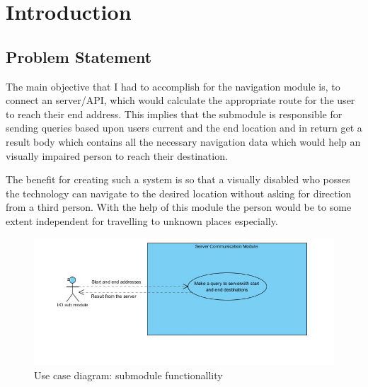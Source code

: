 \newpage
\chapter{Introduction}
	\section{Problem Statement}
		\label{sec:introProblemStatement}
		The main objective that I had to accomplish for the navigation module is, to connect an 
		server/API, which would calculate the appropriate route for the user to reach their end address. 
		This implies that the submodule is responsible for sending queries based upon users 
		current and the end location and in return get a result body which contains
		all the necessary navigation data which would help an visually impaired person to reach their 
		destination.
		
		\par
			The benefit for creating such a system is so that a visually disabled who posses
			the technology can navigate to the desired location without asking for direction
			from a third person. With the help of this module the person would be
			to some extent independent for travelling to unknown places especially. 
	
		\begin{figure}[htbp!]
			\centering \includegraphics[scale=0.8]{grafiken/googleServerCommunication.jpg}
			\caption{Use case diagram: submodule functionallity}
			\label{fig:Google API communication}
		\end{figure}

